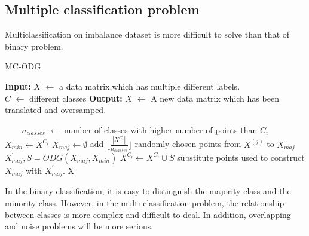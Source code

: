 \documentclass[runningheads]{llncs}
\begin{document}
\subsection{Multiple classification problem}
Multiclassification on imbalance dataset is more difficult to solve than that of binary problem. 
\begin{algorithm}[tb]
    \caption{MC-ODG} %
    \setlength{\abovedisplayskip}{3pt}
    \setlength{\belowdisplayskip}{3pt}
    \label{alg2}
    \hspace*{0.02in} {\bf Input:} %
     $X$ $\leftarrow$ a data matrix,which has multiple different labels.  \\
     $C$ $\leftarrow$ different classes
    \hspace*{0.02in} {\bf Output:} %
     $X$ $\leftarrow$ A new data matrix which has been translated and oversamped.
    \begin{algorithmic}[1]
     
    　　\State $n_{classes}$ $\leftarrow$ number of classes with higher number of points than $C_i$ 
          \State $X_{min} \leftarrow X^{C_i}$ 
          \State $X_{maj} \leftarrow \emptyset$
              \State add $\lfloor \frac{|X^{C_1}|}{n_{classes}} \rfloor$ randomly chosen points from $X^{(j)}$ to $X_{maj}$
          \EndFor
          \State $X_{maj}^{'},S=ODG(X_{maj},X_{min})$
          \State $X^{C_i} \leftarrow X^{C_i} \cup S$
          \State substitute points used to construct $X_{maj}$ with $X_{maj}^{'}$. 
        \EndIf
    \EndFor
    \State \Return X
    \end{algorithmic}
    \end{algorithm}
In the binary classification, 
it is easy to distinguish the majority class and the minority class. 
However, in the multi-classification problem, the relationship between
classes is more complex and difficult to deal.
In addition, overlapping and noise problems will be more serious.
\end{document}
